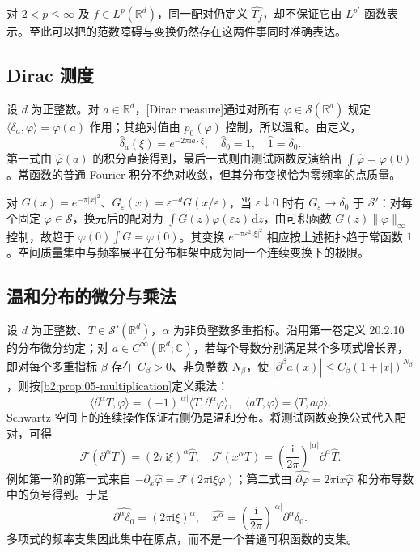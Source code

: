 对 \(2<p\leq\infty\) 及 \(f\in L^p(\mathbb R^d)\)，同一配对仍定义 \(\widehat {T_f}\)，却不保证它由 \(L^{p'}\) 函数表示。至此可以把的范数障碍与变换仍然存在这两件事同时准确表达。

\subsection{Dirac 测度}
\label{b2:subsec:050303}

设 \(d\) 为正整数。对 \(a\in\mathbb R^d\)，[Dirac measure]通过对所有 \(\varphi\in\mathcal S(\mathbb R^d)\) 规定 \(\langle\delta_a,\varphi\rangle=\varphi(a)\) 作用；其绝对值由 \(p_0(\varphi)\) 控制，所以温和。由定义，
\[
 \widehat\delta_a(\xi)=e^{-2\pi\mathrm{i}a\cdot\xi},
 \quad\widehat\delta_0=1,\quad\widehat1=\delta_0.
\]
第一式由 \(\widehat\varphi(a)\) 的积分直接得到，最后一式则由测试函数反演给出 \(\int\widehat\varphi=\varphi(0)\)。常函数的普通 Fourier 积分不绝对收敛，但其分布变换恰为零频率的点质量。

\ProseParagraphBreak

对 \(G(x)=e^{-\pi|x|^2}\)、\(G_\varepsilon(x)=\varepsilon^{-d}G(x/\varepsilon)\)，当 \(\varepsilon\downarrow0\) 时有 \(G_\varepsilon\to\delta_0\) 于 \(\mathcal S'\)：对每个固定 \(\varphi\in\mathcal S\)，换元后的配对为 \(\int G(z)\varphi(\varepsilon z)\,\mathrm{d}z\)，由可积函数 \(G(z)\|\varphi\|_\infty\) 控制，故趋于 \(\varphi(0)\int G=\varphi(0)\)。其变换 \(e^{-\pi\varepsilon^2|\xi|^2}\) 相应按上述\WeakStar{}拓扑趋于常函数 \(1\)。空间质量集中与频率展平在分布框架中成为同一个连续变换下的极限。

\subsection{温和分布的微分与乘法}
\label{b2:subsec:050304}

设 \(d\) 为正整数、\(T\in\mathcal S'(\mathbb R^d)\)，\(\alpha\) 为非负整数多重指标。沿用第一卷定义 20.2.10 的分布微分约定；对 \(a\in C^\infty(\mathbb R^d;\mathbb C)\)，若每个导数分别满足某个多项式增长界，即对每个多重指标 \(\beta\) 存在 \(C_\beta>0\)、非负整数 \(N_\beta\)，使 \(|\partial^\beta a(x)|\leq C_\beta(1+|x|)^{N_\beta}\)，则按\cref{b2:prop:05-multiplication}定义乘法：
\[
 \langle\partial^\alpha T,\varphi\rangle
 =(-1)^{|\alpha|}\langle T,\partial^\alpha\varphi\rangle,
 \quad\langle aT,\varphi\rangle=\langle T,a\varphi\rangle.
\]
Schwartz 空间上的连续操作保证右侧仍是温和分布。将测试函数变换公式代入配对，可得
\begin{equation}\label{b2:eq:05-distribution-operations}
 \mathcal F(\partial^\alpha T)=(2\pi\mathrm{i}\xi)^\alpha\widehat T,
 \quad
 \mathcal F(x^\alpha T)=\left(\dfrac{\mathrm{i}}{2\pi}\right)^{|\alpha|}\partial^\alpha\widehat T.
\end{equation}
例如第一阶的第一式来自 \(-\partial_x\widehat\varphi=\mathcal F(2\pi\mathrm{i}\xi\varphi)\)；第二式由 \(\widehat{\partial\varphi}=2\pi\mathrm{i}x\widehat\varphi\) 和分布导数中的负号得到。于是
\[
 \widehat{\partial^\alpha\delta_0}=(2\pi\mathrm{i}\xi)^\alpha,
 \quad
 \widehat{x^\alpha}=\left(\dfrac{\mathrm{i}}{2\pi}\right)^{|\alpha|}\partial^\alpha\delta_0.
\]
多项式的频率支集因此集中在原点，而不是一个普通可积函数的支集。


